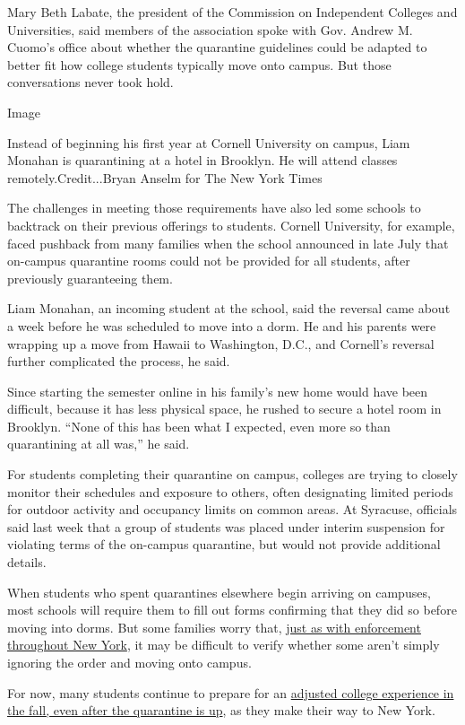 Mary Beth Labate, the president of the Commission on Independent
Colleges and Universities, said members of the association spoke with
Gov. Andrew M. Cuomo's office about whether the quarantine guidelines
could be adapted to better fit how college students typically move onto
campus. But those conversations never took hold.

Image

Instead of beginning his first year at Cornell University on campus,
Liam Monahan is quarantining at a hotel in Brooklyn. He will attend
classes remotely.Credit...Bryan Anselm for The New York Times

The challenges in meeting those requirements have also led some schools
to backtrack on their previous offerings to students. Cornell
University, for example, faced pushback from many families when the
school announced in late July that on-campus quarantine rooms could not
be provided for all students, after previously guaranteeing them.

Liam Monahan, an incoming student at the school, said the reversal came
about a week before he was scheduled to move into a dorm. He and his
parents were wrapping up a move from Hawaii to Washington, D.C., and
Cornell's reversal further complicated the process, he said.

Since starting the semester online in his family's new home would have
been difficult, because it has less physical space, he rushed to secure
a hotel room in Brooklyn. ``None of this has been what I expected, even
more so than quarantining at all was,'' he said.

For students completing their quarantine on campus, colleges are trying
to closely monitor their schedules and exposure to others, often
designating limited periods for outdoor activity and occupancy limits on
common areas. At Syracuse, officials said last week that a group of
students was placed under interim suspension for violating terms of the
on-campus quarantine, but would not provide additional details.

When students who spent quarantines elsewhere begin arriving on
campuses, most schools will require them to fill out forms confirming
that they did so before moving into dorms. But some families worry that,
\href{https://www.nytimes3xbfgragh.onion/2020/08/16/nyregion/coronavirus-quarantine-nyc.html}{just
as with enforcement throughout New York}, it may be difficult to verify
whether some aren't simply ignoring the order and moving onto campus.

For now, many students continue to prepare for an
\href{https://www.nytimes3xbfgragh.onion/2020/08/02/us/covid-college-reopening.html}{adjusted
college experience in the fall, even after the quarantine is up}, as
they make their way to New York.

